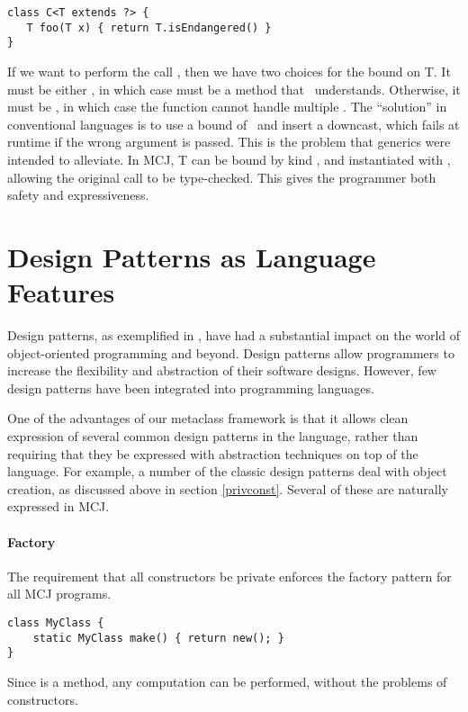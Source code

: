 \documentclass[nocopyrightspace,10pt]{acm-sigplan}
\begin{document}
\begin{verbatim}
class C<T extends ?> {
   T foo(T x) { return T.isEndangered() }
}
\end{verbatim}

If we want to perform the call {}, then we have two
choices for the bound  on {\txt T}.  It must be either \Object,
in which case {} must be a method that \Object\
understands. Otherwise, it must be , in which case the
function cannot handle multiple {\txt{Species}}.  The ``solution'' in
conventional languages is to use a bound of \Object\ and insert a
downcast, which fails at runtime if the wrong argument is passed.
This is the problem that generics were intended to alleviate.  In
MCJ, {\txt T} can be bound by kind {\txt{Species}}, and instantiated
with {\txt{Eagle}}, allowing the original call to be type-checked.
This gives the programmer both safety and expressiveness.

\section{Design Patterns as Language Features}
\label{designpatterns}

Design patterns, as exemplified in \cite{GOF}, have had a substantial
impact on the world of object-oriented programming and beyond.  Design
patterns allow programmers to increase the flexibility and abstraction
of their software designs.  However, few design patterns have been
integrated into programming languages.

One of the advantages of our metaclass framework is that it allows
clean expression of several common design patterns in the language,
rather than requiring that they be expressed with abstraction
techniques on top of the language.  For example, a number of the
classic design patterns deal with object creation, as discussed above
in section \ref{privconst}.  Several of these are naturally expressed
in MCJ.

\paragraph{Factory}
The requirement that all constructors be private enforces the factory
pattern for all MCJ programs.
\begin{verbatim}
class MyClass {
    static MyClass make() { return new(); }
}
\end{verbatim}
Since  is a method, any computation can be performed,
without the problems of constructors.
\end{document}
